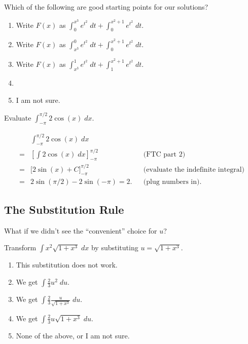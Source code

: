 \documentclass[aspectratio=169, 14pt, t]{beamer}  %
\begin{document}
\begin{poll}
  Which of the following are good starting points for our solutions?

  \begin{enumerate}
    \item Write \(F(x)\) as \(\int_{0}^{x^{3}} e^{t^{2}} \;dt + \int_{0}^{x^{2}+1} e^{t^{2}} \;dt \). 
    \item Write \(F(x)\) as \(\int_{x^{3}}^{0} e^{t^{2}} \;dt + \int_{0}^{x^{2}+1} e^{t^{2}} \;dt \).
    \item Write \(F(x)\) as \(\int_{x^{3}}^{1} e^{t^{2}} \;dt + \int_{1}^{x^{2}+1} e^{t^{2}} \;dt \).
    \item
    \item I am not sure.
  \end{enumerate}
\end{poll}

\begin{poll}
  Evaluate \(\int_{-\pi}^{\pi/2} 2 \cos(x) \;dx\).

  \pause
  \begin{align*}
    &\int_{-\pi}^{\pi/2} 2 \cos(x) \;dx \\
    =& \left[ \int 2 \cos(x) \;dx \right]_{-\pi}^{\pi/2} &&\text{(FTC part 2)} \\
    =& \bigg[ 2\sin(x) + C \bigg]_{-\pi}^{\pi/2} &&\text{(evaluate the indefinite integral)} \\
    =& 2\sin(\pi/2) - 2\sin(-\pi) = 2. &&\text{(plug numbers in)}.
  \end{align*}
\end{poll}

\subsection{The Substitution Rule}

\begin{poll}
  What if we didn't see the ``convenient'' choice for \(u\)?

  Transform \(\int x^{2} \sqrt{ 1 + x^{3} } \;dx\) by substituting \(u = \sqrt{ 1 + x^{3} }\).

  \begin{enumerate} \setlength\itemsep{1ex}
    \item This substitution does not work.
    \item We get \(\int \frac{2}{3} u^{2} \;du\). 
    \item We get \(\int \frac{2}{3} \frac{u}{\sqrt{ 1 + x^{3} }} \;du\). 
    \item We get \(\int \frac{2}{3} u \sqrt{1 + x^{3}} \;du\). 
    \item None of the above, or I am not sure.
  \end{enumerate}
\end{poll}
\end{document}
